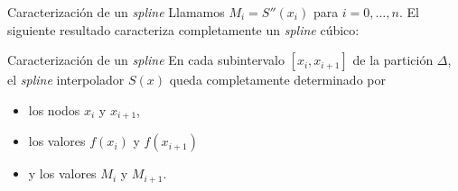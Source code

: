 \begin{frame}{Caracterización de un \textit{spline}}
  Llamamos $M_i = S''(x_i)$ para $i = 0, \dots, n$. El siguiente resultado
  caracteriza completamente un \textit{spline} cúbico:

  \begin{exampleblock}{Caracterización de un \textit{spline}}
    En cada subintervalo $[x_i, x_{i + 1}]$ de la partición $\Delta$, el
    \textit{spline} interpolador $S(x)$ queda completamente determinado por
    \begin{itemize}[<+->]
      \item los nodos $x_i$ y $x_{i + 1}$,
      \item los valores $f(x_i)$ y $f(x_{i + 1})$
      \item y los valores $M_i$ y $M_{i + 1}$.
    \end{itemize}
  \end{exampleblock}
\end{frame}
